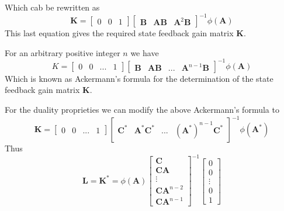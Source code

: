 \documentclass[11pt,a4paper,oneside]{book}
\numberwithin{equation}{section}
\theoremstyle{it}
\theoremstyle{definition}
\begin{document}
Which cab be rewritten as
\begin{equation*}
	\mathbf{K} = \begin{bmatrix} 
		0&0&1
	\end{bmatrix}
	\begin{bmatrix}
		\mathbf{B} & \mathbf{AB} & \mathbf{A}^2\mathbf{B}
	\end{bmatrix}^{-1} \phi(\mathbf{A})
\end{equation*}
This last equation gives the required state feedback gain matrix $\mathbf{K}$.

For an arbitrary positive integer $n$ we have
\begin{equation} \label{ackermann_7}
	K = \begin{bmatrix} 
		0&0&...&1
	\end{bmatrix}
	\begin{bmatrix}
		\mathbf{B} & \mathbf{AB} & ...& \mathbf{A}^{n-1}\mathbf{B}
	\end{bmatrix}^{-1} \phi(\mathbf{A})
\end{equation}
Which is known as Ackermann's formula for the determination of the state 
feedback gain matrix $\mathbf{K}$.

For the duality proprieties we can modify the above Ackermann's formula to
\begin{equation} \label{ackermann_8}
	\mathbf{K} = \begin{bmatrix} 
		0&0&...&1
	\end{bmatrix}
	\begin{bmatrix}
		\mathbf{C}^* & \mathbf{A}^*\mathbf{C}^* & ...& (\mathbf{A}^*)^{n-1}\mathbf{C}^*
	\end{bmatrix}^{-1} \phi(\mathbf{A}^*)
\end{equation}
Thus
\begin{equation} \label{ackermann_9}
	\mathbf{L} =\mathbf{K}^*= \phi(\mathbf{A}) \begin{bmatrix} 
		\mathbf{C} \\
		\mathbf{CA} \\
		\vdots \\
		\mathbf{CA}^{n-2} \\
		\mathbf{CA}^{n-1}
	\end{bmatrix}^{-1}
	\begin{bmatrix}
		0 \\
		0 \\
		\vdots \\
		0 \\
		1
	\end{bmatrix}
\end{equation}
\end{document}
